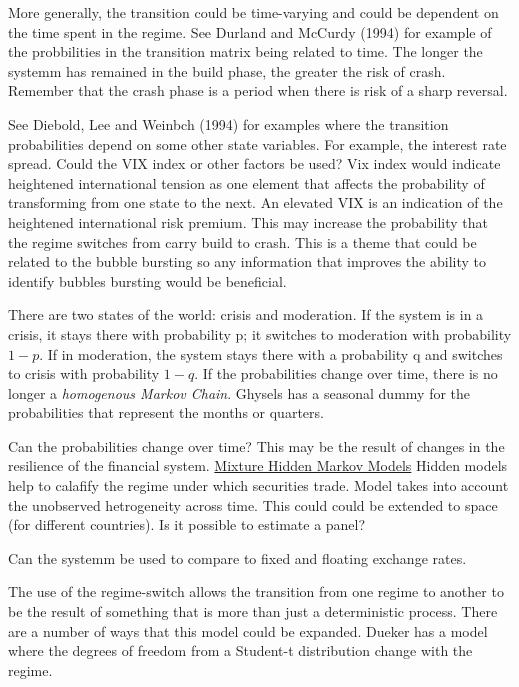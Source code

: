 \documentclass[12pt, a4paper, oneside]{article} %
\begin{document}
More generally, the transition could be time-varying and could be dependent on the time spent in the regime.  See Durland and McCurdy (1994) for example of the probbilities  in the transition matrix being related to time. The longer the systemm has remained in the build phase, the greater the risk of crash.  Remember that the crash phase is a period when there is risk of a sharp reversal.  

See Diebold, Lee and Weinbch (1994) for examples where the transition probabilities depend on some other state variables.  For example, the interest rate spread.   Could the VIX index or other factors be used?  Vix index would indicate heightened international tension as one element that affects the probability of transforming from one state to the next.  An elevated VIX is an indication of the heightened international risk premium.  This may increase the probability that the regime switches from carry build to crash.  This is a theme that could be related to the bubble bursting so any information that improves the ability to identify bubbles bursting would be beneficial.  


  There are two states of the world:  crisis and moderation.  If the system is in a crisis, it stays there with probability p; it switches to moderation with probability $1-p$.  If in moderation, the system stays there with a probability q and switches to crisis with probability $1-q$.  If the probabilities change over time, there is no longer a \emph{homogenous Markov Chain}. Ghysels has a seasonal dummy for the probabilities that represent the months or quarters.  

Can the probabilities change over time?  This may be the result of changes in the resilience of the financial system. 
\href{http://members.home.nl/jeroenvermunt/dias2010.pdf}{Mixture Hidden Markov Models} Hidden models help to calafify the regime under which securities trade. Model takes into account the unobserved hetrogeneity across time. This could could be extended to space (for different countries).  Is it possible to estimate a panel? 

Can the systemm be used to compare to fixed and floating exchange rates. 

The use of the regime-switch allows the transition from one regime to another to be the result of something that is more than just a deterministic process. There are a number of ways that this model could be expanded.  Dueker has a model where the degrees of freedom from a Student-t distribution change with the regime.  
\end{document}
